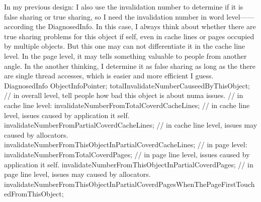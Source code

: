 In my previous design:
    I also use the invalidation number to determine if it is false sharing or true sharing, so I need the invalidation number in word
level------according the DiagnosedInfo. In this case, I always think about whether there are true sharing problems for this object
if self, even in cache lines or pages occupied by multiple objects. But this one may can not differentiate it in the cache line level.
In the page level, it may tells something valuable to people from another angle.
In the another thinking, I determine it as false sharing as long as the there are single thread accesses, which is easier and more efficient I guess.
        DiagnosedInfo {
                ObjectInfoPointer;
                totalInvalidateNumberCauseedByThisObject;   // in overall level, tell people how bad this object is about numa issues.
                // in cache line level:
                invalidateNumberFromTotalCoverdCacheLines;   // in cache line level, issues caused by application it self.
                invalidateNumberFromPartialCoverdCacheLines;  // in cache line level, issues may caused by allocators.
                invalidateNumberFromThisObjectInPartialCoverdCacheLines;
                // in page level:
                invalidateNumberFromTotalCoverdPages;    // in page line level, issues caused by application it self.
                invalidateNumberFromThisObjectInPartialCoverdPages;   // in page line level, issues may caused by allocators.
                invalidateNumberFromThisObjectInPartialCoverdPagesWhenThePageFirstTouchedFromThisObject;
        }
